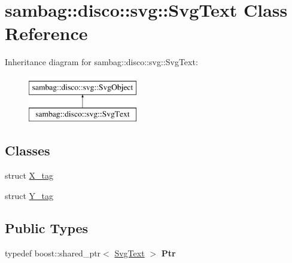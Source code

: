 \hypertarget{classsambag_1_1disco_1_1svg_1_1_svg_text}{
\section{sambag::disco::svg::SvgText Class Reference}
\label{classsambag_1_1disco_1_1svg_1_1_svg_text}
}
Inheritance diagram for sambag::disco::svg::SvgText:\begin{figure}[H]
\begin{center}
\leavevmode
\includegraphics[height=2.000000cm]{classsambag_1_1disco_1_1svg_1_1_svg_text}
\end{center}
\end{figure}
\subsection*{Classes}
\begin{DoxyCompactItemize}
\item 
struct \hyperlink{structsambag_1_1disco_1_1svg_1_1_svg_text_1_1_x__tag}{X\_\-tag}
\item 
struct \hyperlink{structsambag_1_1disco_1_1svg_1_1_svg_text_1_1_y__tag}{Y\_\-tag}
\end{DoxyCompactItemize}
\subsection*{Public Types}
\begin{DoxyCompactItemize}
\item 
\hypertarget{classsambag_1_1disco_1_1svg_1_1_svg_text_a308df1e62790016f39c4f9ff808d0a26}{
typedef boost::shared\_\-ptr$<$ \hyperlink{classsambag_1_1disco_1_1svg_1_1_svg_text}{SvgText} $>$ {\bfseries Ptr}}
\label{classsambag_1_1disco_1_1svg_1_1_svg_text_a308df1e62790016f39c4f9ff808d0a26}

\end{DoxyCompactItemize}
